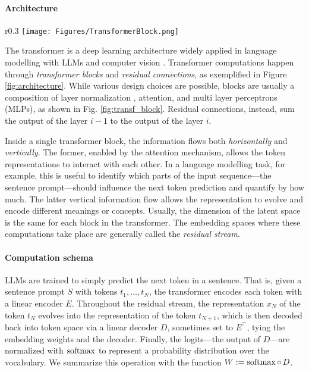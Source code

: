 \paragraph{Architecture}
\begin{wrapfigure}{r}{0.3\textwidth} %
    \vspace{-0.4cm}
    \centering
    \texttt{[image: Figures/TransformerBlock.png]}
    \caption{Structure of a generic Transformer block.}%
    \label{fig:transf_block}
    \vspace{-0.4cm}
\end{wrapfigure}
The transformer \citep{vaswani2023attentionneed} is a deep learning architecture widely applied in language modelling with LLMs \citep{brown2020languagemodelsfewshotlearners} and computer vision \citep{dosovitskiy2021imageworth16x16words}. Transformer computations happen through \textit{transformer blocks} and \textit{residual connections}, as exemplified in Figure \ref{fig:architecture}. While various design choices are possible, blocks are usually a composition of layer normalization \citep{zhang2019rootmeansquarelayer}, attention, and multi layer perceptrons (MLPs), as shown in Fig. \ref{fig:transf_block}. Residual connections, instead, sum the output of the layer $i-1$ to the output of the layer $i$.   

Inside a single transformer block, the information flows both \textit{horizontally} and \textit{vertically}. The former, enabled by the attention mechanism, allows the token representations to interact with each other. In a language modelling task, for example, this is useful to identify which parts of the input sequence—the sentence prompt—should influence the next token prediction and quantify by how much. The latter vertical information flow allows the representation to evolve and encode different meanings or concepts. Usually, the dimension of the latent space is the same for each block in the transformer. The embedding spaces where these computations take place are generally called the \textit{residual stream}.

\paragraph{Computation schema} 
LLMs are trained to simply predict the next token in a sentence. That is, given a sentence prompt $S$ with tokens $t_1,\dots,t_N$, the transformer encodes each token with a linear encoder $E$. Throughout the residual stream, the representation $x_N$ of the token $t_N$ evolves into the representation of the token $t_{N+1}$, which is then decoded back into token space via a linear decoder $D$, sometimes set to $E^\top$, tying the embedding weights and the decoder. Finally, the logits—the output of $D$—are normalized with $\operatorname{softmax}$ to represent a probability distribution over the vocabulary. We summarize this operation with the function $W:=\operatorname{softmax}\circ\,D$.

